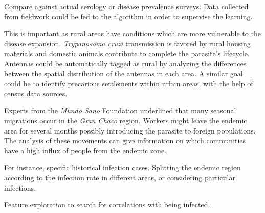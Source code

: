 \begin{description}
    \item [Results validation.] Compare against actual serology or disease prevalence surveys. Data collected from fieldwork could be fed to the algorithm in order to supervise the learning.

    \item [Differentiating rural antennas from urban ones.] This is important as rural areas have conditions which are more vulnerable to the disease expansion. \textit{Trypanosoma cruzi} transmission is favored by rural housing materials and domestic animals contribute to complete the parasite's lifecycle. Antennas could be automatically tagged as rural by analyzing the differences between the spatial distribution of the antennas in each area. A similar goal could be to identify precarious settlements within urban areas, with the help of census data sources.

    \item [Seasonal migration analysis.] Experts from the \textit{Mundo Sano} Foundation underlined that many seasonal migrations occur in the \textit{Gran Chaco} region.
    Workers might leave the endemic area for several months possibly introducing the parasite to foreign populations.
    The analysis of these movements can give information on which communities have a high influx of people from the endemic zone.

    \item [Search for epidemiological data at a finer grain.] For instance, specific historical infection cases. Splitting the endemic region according to the infection rate in different areas, or considering particular infections.
    \item Feature exploration to search for correlations with being infected.
\end{description}






